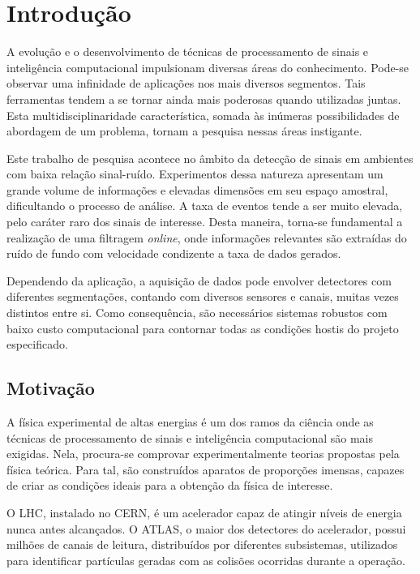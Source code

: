 \chapter{Introdução}

A evolução e o desenvolvimento de técnicas de processamento de sinais e
inteligência computacional impulsionam diversas áreas do conhecimento. Pode-se
observar uma infinidade de aplicações nos mais diversos segmentos. Tais
ferramentas tendem a se tornar ainda mais poderosas quando utilizadas juntas.
Esta multidisciplinaridade característica, somada às inúmeras possibilidades de
abordagem de um problema, tornam a pesquisa nessas áreas instigante.

Este trabalho de pesquisa acontece no âmbito da detecção de sinais em ambientes
com baixa relação sinal-ruído. Experimentos dessa natureza apresentam um grande
volume de informações e elevadas dimensões em seu espaço amostral, dificultando
o processo de análise. A taxa de eventos tende a ser muito
elevada, pelo caráter raro dos sinais de interesse. Desta maneira, torna-se
fundamental a realização de uma filtragem \emph{online}, onde informações
relevantes são extraídas do ruído de fundo com velocidade condizente a taxa de
dados gerados.

Dependendo da aplicação, a aquisição de dados pode envolver detectores com
diferentes segmentações, contando com diversos sensores e canais, muitas vezes
distintos entre si.  Como consequência, são necessários sistemas robustos com
baixo custo computacional para contornar todas as condições hostis do projeto
especificado.

\section{Motivação}

A física experimental de altas energias é um dos ramos da ciência onde as
técnicas de processamento de sinais e inteligência computacional são mais
exigidas. Nela, procura-se comprovar experimentalmente teorias propostas pela
física teórica. Para tal, são construídos aparatos de proporções imensas,
capazes de criar as condições ideais para a obtenção da física de interesse.

O LHC, instalado no CERN, é um acelerador capaz de atingir níveis de energia
nunca antes alcançados. O ATLAS, o maior dos detectores do acelerador, possui
milhões de canais de leitura, distribuídos por diferentes subsistemas,
utilizados para identificar partículas geradas com as colisões ocorridas durante
a operação.

